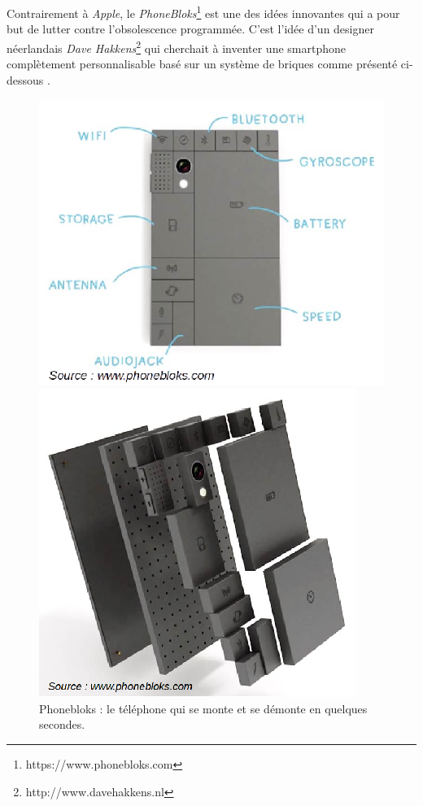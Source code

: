 \bigbreak
Contrairement à \textit{Apple}, le \textit{PhoneBloks}\footnote{https://www.phonebloks.com} est une des idées innovantes qui a pour but de lutter contre l'obsolescence programmée. C'est l'idée d'un designer néerlandais \textit{Dave Hakkens}\footnote{http://www.davehakkens.nl} qui cherchait à inventer une smartphone complètement personnalisable basé sur un système de briques comme présenté ci-dessous \cite{op_pb}.
\begin{figure}[h]
\begin{minipage}{0.5\linewidth}
\begin{center}
\includegraphics[scale=0.6]{Rsc/phonebloks2.png} 
\end{center}
\end{minipage}
\begin{minipage}{0.5\linewidth}
\begin{center}
\includegraphics[scale=0.7]{Rsc/phonebloks1.png} 
\end{center}
\end{minipage}
\caption{\scriptsize{Phonebloks : le téléphone qui se monte et se démonte en quelques secondes.}}
\label{phonebloks}
\end{figure}

